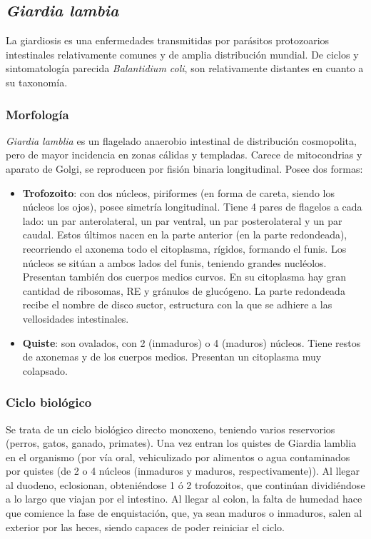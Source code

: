\subsection{\textit{Giardia lambia}}
La giardiosis es una enfermedades transmitidas por parásitos protozoarios intestinales relativamente comunes y de amplia distribución mundial. De ciclos y sintomatología parecida \textit{Balantidium coli}, son relativamente distantes en cuanto a su taxonomía.
\subsubsection{Morfología}
\textit{Giardia lamblia} es un flagelado anaerobio intestinal de distribución cosmopolita, pero de mayor incidencia en zonas cálidas y templadas. Carece de mitocondrias y aparato de Golgi, se reproducen por fisión binaria longitudinal. Posee dos formas:
\begin{itemize}[itemsep=0pt,parsep=0pt,topsep=0pt,partopsep=0pt]
	\item \textbf{Trofozoito}: con dos núcleos, piriformes (en forma de careta, siendo los núcleos los ojos), posee simetría longitudinal. Tiene 4 pares de flagelos a cada lado: un par anterolateral, un par ventral, un par posterolateral y un par caudal. Estos últimos nacen en la parte anterior (en la parte redondeada), recorriendo el axonema todo el citoplasma, rígidos, formando el funis. Los núcleos se sitúan a ambos lados del funis, teniendo grandes nucléolos. Presentan también dos cuerpos medios curvos. En su citoplasma hay gran cantidad de ribosomas, RE y gránulos de glucógeno. La parte redondeada recibe el nombre de disco suctor, estructura con la que se adhiere a las vellosidades intestinales.
	\item \textbf{Quiste}: son ovalados, con 2 (inmaduros) o 4 (maduros) núcleos. Tiene restos de axonemas y de los cuerpos medios. Presentan un citoplasma muy colapsado.
\end{itemize}
\subsubsection{Ciclo biológico}
Se trata de un ciclo biológico directo monoxeno, teniendo varios reservorios (perros, gatos, ganado, primates). Una vez entran los quistes de Giardia lamblia en el organismo (por vía oral, vehiculizado por alimentos o agua contaminados por quistes (de 2 o 4 núcleos (inmaduros y maduros, respectivamente)). Al llegar al duodeno, eclosionan, obteniéndose 1 ó 2 trofozoitos, que continúan dividiéndose a lo largo que viajan por el intestino. Al llegar al colon, la falta de humedad hace que comience la fase de enquistación, que, ya sean maduros o inmaduros, salen al exterior por las heces, siendo capaces de poder reiniciar el ciclo.

